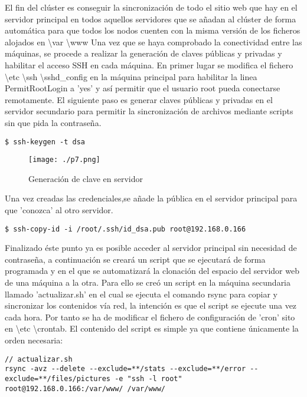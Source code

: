 \documentclass[paper=a4, fontsize=12pt]{scrartcl} %
\begin{document}
El fin del clúster es conseguir la sincronización de todo el sitio web que hay en el servidor principal en todos aquellos servidores que se añadan al clúster de forma automática para que todos los nodos cuenten con la misma versión de los ficheros alojados en \textbackslash var \textbackslash www
Una vez que se haya comprobado la conectividad entre las máquinas, se procede a realizar la generación de claves públicas y privadas y habilitar el acceso SSH en cada máquina. En primer lugar se modifica el fichero \textbackslash etc \textbackslash ssh \textbackslash sshd\_config en la máquina principal para habilitar la linea PermitRootLogin a 'yes' y así permitir que el usuario root pueda conectarse remotamente. El siguiente paso es generar claves públicas y privadas en el servidor secundario para permitir la sincronización de archivos mediante scripts sin que pida la contraseña.

\begin{lstlisting}
$ ssh-keygen -t dsa
\end{lstlisting}

\begin{figure}[H] %
	\centering
	\label{lsblk}
	\texttt{[image: ./p7.png]}
	\caption{Generación de clave en servidor} 
\end{figure}

Una vez creadas las credenciales,se añade la pública en el servidor principal para que 'conozca' al otro servidor.
\begin{lstlisting}
$ ssh-copy-id -i /root/.ssh/id_dsa.pub root@192.168.0.166
\end{lstlisting}

Finalizado éste punto ya es posible acceder al servidor principal sin necesidad de contraseña, a continuación se creará un script que se ejecutará de forma programada y en el que se automatizará la clonación del espacio del servidor web de una máquina a la otra. Para ello se creó un script en la máquina secundaria llamado 'actualizar.sh' en el cual se ejecuta el comando rsync para copiar y sincronizar los contenidos vía red, la intención es que el script se ejecute una vez cada hora. Por tanto se ha de modificar el fichero de configuración de 'cron' sito en \textbackslash etc \textbackslash crontab. El contenido del script es simple ya que contiene únicamente la orden necesaria:

\begin{lstlisting}
// actualizar.sh
rsync -avz --delete --exclude=**/stats --exclude=**/error --exclude=**/files/pictures -e "ssh -l root" root@192.168.0.166:/var/www/ /var/www/
\end{lstlisting}
\end{document}

